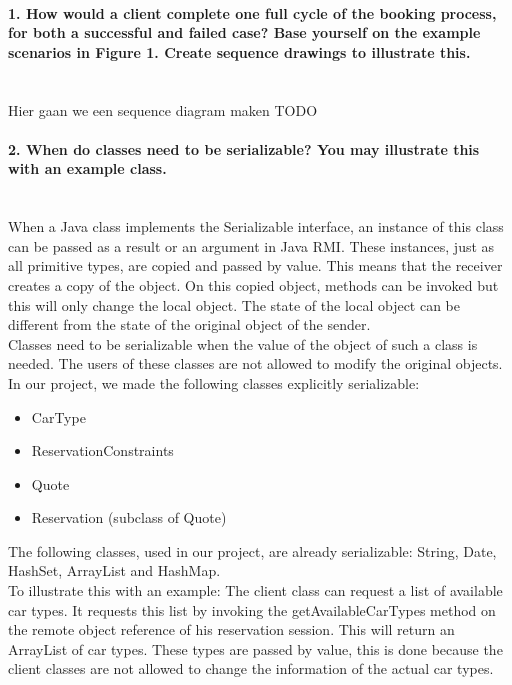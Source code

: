 \documentclass{ds-report}
\begin{document}
	\maketitle

	\paragraph{1. How would a client complete one full cycle of the booking process, for both a successful and
failed case? Base yourself on the example scenarios in Figure 1. Create sequence drawings to
illustrate this.} \mbox{}\\
	Hier gaan we een sequence diagram maken TODO
	
	\paragraph{2. When do classes need to be serializable? You may illustrate this with an example class.} \mbox{}\\
When a Java class implements the Serializable interface, an instance of this class can be passed as a result or an argument in Java RMI. These instances, just as all primitive types, are copied and passed by value. This means that the receiver creates a copy of the object. On this copied object, methods can be invoked but this will only change the local object. The state of the local object can be different from the state of the original object of the sender. \\
Classes need to be serializable when the value of the object of such a class is needed. The users of these classes are not allowed to modify the original objects. In our project, we made the following classes explicitly serializable:
\begin{itemize}
	\item CarType 
	\item ReservationConstraints 
	\item Quote
	\item Reservation (subclass of Quote)
\end{itemize}
The following classes, used in our project, are already serializable: String, Date, HashSet, ArrayList and HashMap.\\
To illustrate this with an example: The client class can request a list of available car types. It requests this list by invoking the getAvailableCarTypes method on the remote object reference of his reservation session. This will return an ArrayList of car types. These types are passed by value, this is done because the client classes are not allowed to change the information of the actual car types.
\end{document}
